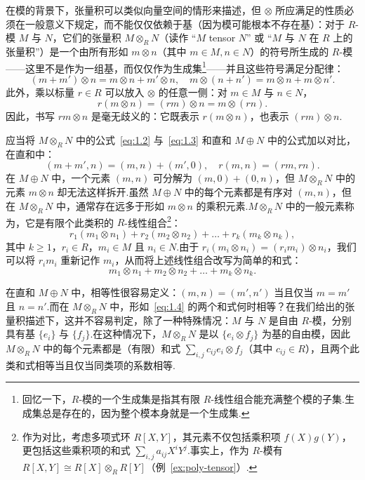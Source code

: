 在模的背景下，张量积可以类似向量空间的情形来描述，但 $\otimes$ 所应满足的性质必须在一般意义下规定，而不能仅仅依赖于基（因为模可能根本不存在基）：对于 $R$-模 $M$ 与 $N$，它们的张量积 $M \otimes_R N$（读作 ``$M$ tensor $N$'' 或 ``$M$ 与 $N$ 在 $R$ 上的张量积''）是一个由所有形如 $m \otimes n$（其中 $m \in M, n \in N$）的符号所生成的 $R$-模——这里不是作为一组基，而仅仅作为生成集\footnote{回忆一下，$R$-模的一个生成集是指其有限 $R$-线性组合能充满整个模的子集.生成集总是存在的，因为整个模本身就是一个生成集.}——并且这些符号满足分配律：
\begin{equation}
  (m + m') \otimes n = m \otimes n + m' \otimes n, \quad m \otimes (n + n') = m \otimes n + m \otimes n'. \label{eq:1.2}
\end{equation}
此外，乘以标量 $r \in R$ 可以放入 $\otimes$ 的任意一侧：对 $m \in M$ 与 $n \in N$，
\begin{equation}
  r(m \otimes n) = (rm) \otimes n = m \otimes (rn). \label{eq:1.3}
\end{equation}
因此，书写 $rm \otimes n$ 是毫无歧义的：它既表示 $r(m \otimes n)$，也表示 $(rm) \otimes n$.

应当将 $M \otimes_R N$ 中的公式~\eqref{eq:1.2} 与~\eqref{eq:1.3} 和直和 $M \oplus N$ 中的公式加以对比，在直和中：
\[
  (m + m', n) = (m, n) + (m', 0), \quad r(m, n) = (rm, rn).
\]
在 $M \oplus N$ 中，一个元素 $(m, n)$ 可分解为 $(m, 0) + (0, n)$，但 $M \otimes_R N$ 中的元素 $m \otimes n$ 却无法这样拆开.虽然 $M \oplus N$ 中的每个元素都是有序对 $(m, n)$，但在 $M \otimes_R N$ 中，通常存在远多于形如 $m \otimes n$ 的乘积元素.$M \otimes_R N$ 中的一般元素称为，它是有限个此类积的 $R$-线性组合\footnote{作为对比，考虑多项式环 $R[X, Y]$，其元素不仅包括乘积项 $f(X)g(Y)$，更包括这些乘积项的和式 $\sum_{i,j} a_{ij} X^i Y^j$.事实上，作为 $R$-模有 $R[X, Y] \cong R[X] \otimes_R R[Y]$（例~\ref{ex:poly-tensor}）.}：
\[
  r_1(m_1 \otimes n_1) + r_2(m_2 \otimes n_2) + \dots + r_k(m_k \otimes n_k),
\]
其中 $k \geq 1$，$r_i \in R$，$m_i \in M$ 且 $n_i \in N$.由于 $r_i(m_i \otimes n_i) = (r_i m_i) \otimes n_i$，我们可以将 $r_i m_i$ 重新记作 $m_i$，从而将上述线性组合改写为简单的和式：
\begin{equation}
  m_1 \otimes n_1 + m_2 \otimes n_2 + \dots + m_k \otimes n_k. \label{eq:1.4}
\end{equation}

在直和 $M \oplus N$ 中，相等性很容易定义：$(m, n) = (m', n')$ 当且仅当 $m = m'$ 且 $n = n'$.而在 $M \otimes_R N$ 中，形如~\eqref{eq:1.4} 的两个和式何时相等？在我们给出的张量积描述下，这并不容易判定，除了一种特殊情况：$M$ 与 $N$ 是自由 $R$-模，分别具有基 $\{e_i\}$ 与 $\{f_j\}$.在这种情况下，$M \otimes_R N$ 是以 $\{e_i \otimes f_j\}$ 为基的自由模，因此 $M \otimes_R N$ 中的每个元素都是（有限）和式 $\sum_{i,j} c_{ij} e_i \otimes f_j$（其中 $c_{ij} \in R$），且两个此类和式相等当且仅当同类项的系数相等.

